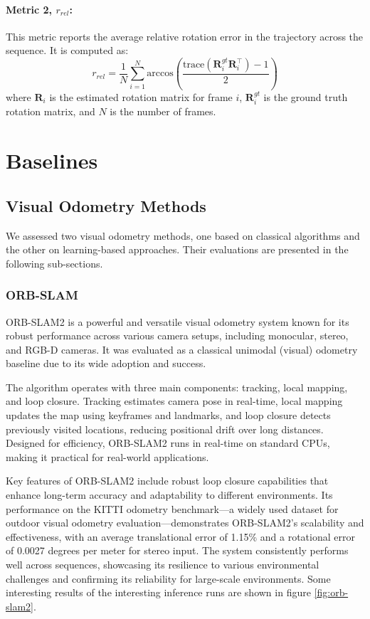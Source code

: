 \documentclass[11pt,a4paper]{article}
\begin{document}
\paragraph{\textbf{Metric 2,   }\textit{$r_{rel}$}:}
This metric reports the average relative rotation error in the trajectory across the sequence. It is computed as:
\[
r_{rel} = \frac{1}{N} \sum_{i=1}^{N} \text{arccos} \left( \frac{\text{trace}(\mathbf{R}_i^{gt} \mathbf{R}_i^\top) - 1}{2} \right)
\]
where $\mathbf{R}_i$ is the estimated rotation matrix for frame $i$, $\mathbf{R}_i^{gt}$ is the ground truth rotation matrix, and $N$ is the number of frames. \\


\clearpage
\section{Baselines}

\subsection{Visual Odometry Methods}

We assessed two visual odometry methods, one based on classical algorithms and the other on learning-based approaches. Their evaluations are presented in the following sub-sections.
\subsubsection{ORB-SLAM}
ORB-SLAM2 \cite{orb-slam2} is a powerful and versatile visual odometry system known for its robust performance across various camera setups, including monocular, stereo, and RGB-D cameras. It was evaluated as a classical unimodal (visual) odometry baseline due to its wide adoption and success.

The algorithm operates with three main components: tracking, local mapping, and loop closure. Tracking estimates camera pose in real-time, local mapping updates the map using keyframes and landmarks, and loop closure detects previously visited locations, reducing positional drift over long distances. Designed for efficiency, ORB-SLAM2 runs in real-time on standard CPUs, making it practical for real-world applications.

Key features of ORB-SLAM2 include robust loop closure capabilities that enhance long-term accuracy and adaptability to different environments. Its performance on the KITTI \cite{KITTI} odometry benchmark—a widely used dataset for outdoor visual odometry evaluation—demonstrates ORB-SLAM2's scalability and effectiveness, with an average translational error of 1.15\% and a rotational error of 0.0027 degrees per meter for stereo input. The system consistently performs well across sequences, showcasing its resilience to various environmental challenges and confirming its reliability for large-scale environments. Some interesting results of the interesting inference runs are shown in figure \ref{fig:orb-slam2}.
\end{document}
